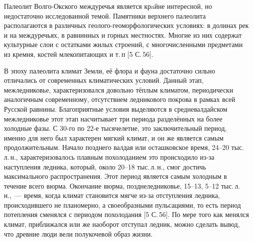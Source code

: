  

\makeProcTitle
{}


Палеолит Волго-Окского междуречья является крaйне интересной, но недостаточно исследованной темой. Памятники верхнего палеолита располагаются в различных геолого-геоморфологических условиях: в долинах рек и на междуречьях, в равнинных и горных местностях. Многие из них содержат культурные слои с остатками жилых строений, с многочисленными предметами из кремня, костей млекопитающих и т.\,п [5 С.\,56].

В эпоху палеолита климат Земли, её флора и фауна достаточно сильно отличались от современных климатических условий. Данный этап, межледниковье, характеризовался довольно тёплым климатом, периодически аналогичным современному, отсутствием ледникового покрова в рамках всей Русской равнины. Благоприятные условия выделяются в средневалдайском межледниковье этот этап насчитывает три периода разделённых на более холодные фазы. С 30-го по 22-е тысячелетие, это заключительный период, именно для него был характерен мягкий климат, и он же является самым продолжительным. Начало позднего валдая или осташковское время, 24--20 тыс.\,л.\,н., характеризовалось плавным похолоданием это происходило из-за наступления ледника, который, около 20--18 тыс.\,л.\,н., смог достичь максимального распространения. Этот период является самым холодным в течение всего вюрма. Окончание вюрма, позднеледниковье, 15--13, 5--12 тыс.\,л.\,н.,~--- время, когда климат становится мягче из-за отступления ледника, происходившего не планомерно, а своеобразными пульсациями, то есть период потепления сменялся с периодом похолодания [5 С.\,56]. По мере того как менялся климат, приближался или же наоборот отступал ледник, можно сделать вывод, что древние люди вели полукочевой образ жизни.

